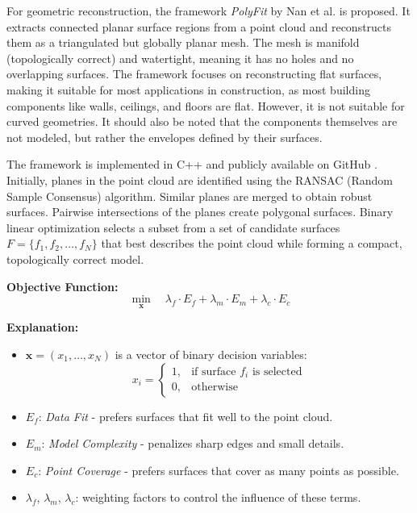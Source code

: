 \begin{English}
    For geometric reconstruction, the framework \textit{PolyFit} by Nan et al. \cite{nanPolyFitFramework2023} is proposed. It extracts connected planar surface regions from a point cloud and reconstructs them as a triangulated but globally planar mesh. The mesh is manifold (topologically correct) and watertight, meaning it has no holes and no overlapping surfaces. The framework focuses on reconstructing flat surfaces, making it suitable for most applications in construction, as most building components like walls, ceilings, and floors are flat. However, it is not suitable for curved geometries. It should also be noted that the components themselves are not modeled, but rather the envelopes defined by their surfaces.

    The framework is implemented in C++ and publicly available on GitHub \cite{nanLiangliangNanPolyFit2025}. Initially, planes in the point cloud are identified using the RANSAC (Random Sample Consensus) algorithm. Similar planes are merged to obtain robust surfaces. Pairwise intersections of the planes create polygonal surfaces. Binary linear optimization selects a subset from a set of candidate surfaces $F = \{f_1, f_2, \dots, f_N\}$ that best describes the point cloud while forming a compact, topologically correct model.

    \vspace{1em}
    \noindent
    \textbf{Objective Function:}
    \[
    \min_{\mathbf{x}} \quad
    \lambda_f \cdot E_f + \lambda_m \cdot E_m + \lambda_c \cdot E_c
    \]

    \vspace{1em}
    \noindent
    \textbf{Explanation:}
    \begin{itemize}
    \item $\mathbf{x} = (x_1, \dots, x_N)$ is a vector of binary decision variables:
        \[
        x_i =
        \begin{cases}
        1, & \text{if surface } f_i \text{ is selected} \\
        0, & \text{otherwise}
        \end{cases}
        \]
    \item $E_f$: \textit{Data Fit} - prefers surfaces that fit well to the point cloud.
    \item $E_m$: \textit{Model Complexity} - penalizes sharp edges and small details.
    \item $E_c$: \textit{Point Coverage} - prefers surfaces that cover as many points as possible.
    \item $\lambda_f$, $\lambda_m$, $\lambda_c$: weighting factors to control the influence of these terms.
    \end{itemize}


\end{English}
